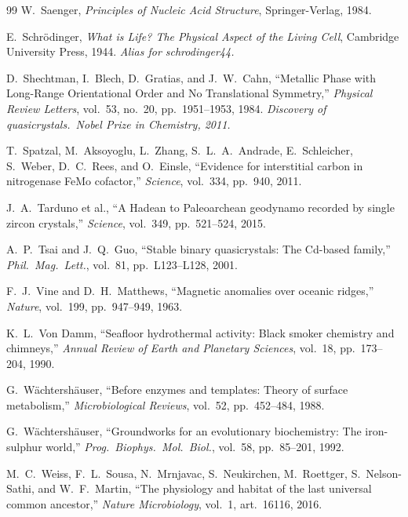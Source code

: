 \begin{thebibliography}{99}
W.~Saenger,
\emph{Principles of Nucleic Acid Structure},
Springer-Verlag, 1984.

E.~Schr\"odinger,
\emph{What is Life? The Physical Aspect of the Living Cell},
Cambridge University Press, 1944.
\textit{Alias for schrodinger44.}

D.~Shechtman, I.~Blech, D.~Gratias, and J.~W.~Cahn,
``Metallic Phase with Long-Range Orientational Order and No Translational Symmetry,''
\emph{Physical Review Letters}, vol.~53, no.~20, pp.~1951--1953, 1984.
\textit{Discovery of quasicrystals.\ Nobel Prize in Chemistry, 2011.}

T.~Spatzal, M.~Aksoyoglu, L.~Zhang, S.~L.~A.~Andrade, E.~Schleicher, S.~Weber,
D.~C.~Rees, and O.~Einsle,
``Evidence for interstitial carbon in nitrogenase FeMo cofactor,''
\emph{Science}, vol.~334, pp.~940, 2011.

J.~A.~Tarduno et al.,
``A Hadean to Paleoarchean geodynamo recorded by single zircon crystals,''
\emph{Science}, vol.~349, pp.~521--524, 2015.

A.~P.~Tsai and J.~Q.~Guo,
``Stable binary quasicrystals: The Cd-based family,''
\emph{Phil.\ Mag.\ Lett.}, vol.~81, pp.~L123--L128, 2001.

F.~J.~Vine and D.~H.~Matthews,
``Magnetic anomalies over oceanic ridges,''
\emph{Nature}, vol.~199, pp.~947--949, 1963.

K.~L.~Von Damm,
``Seafloor hydrothermal activity: Black smoker chemistry and chimneys,''
\emph{Annual Review of Earth and Planetary Sciences}, vol.~18, pp.~173--204, 1990.

G.~W\"achtersh\"auser,
``Before enzymes and templates: Theory of surface metabolism,''
\emph{Microbiological Reviews}, vol.~52, pp.~452--484, 1988.

G.~W\"achtersh\"auser,
``Groundworks for an evolutionary biochemistry: The iron-sulphur world,''
\emph{Prog.\ Biophys.\ Mol.\ Biol.}, vol.~58, pp.~85--201, 1992.

M.~C.~Weiss, F.~L.~Sousa, N.~Mrnjavac, S.~Neukirchen, M.~Roettger,
S.~Nelson-Sathi, and W.~F.~Martin,
``The physiology and habitat of the last universal common ancestor,''
\emph{Nature Microbiology}, vol.~1, art.~16116, 2016.



\end{thebibliography}
